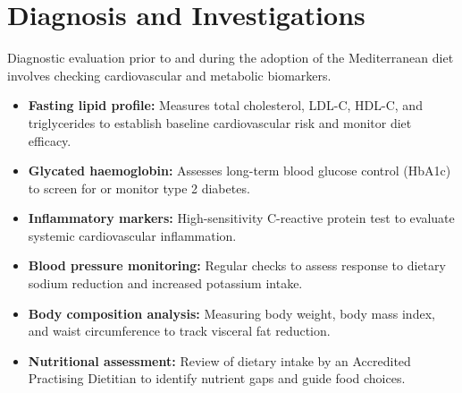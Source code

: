 \section*{Diagnosis and Investigations}
Diagnostic evaluation prior to and during the adoption of the Mediterranean diet involves checking cardiovascular and metabolic biomarkers.
\begin{itemize}
    \item \textbf{Fasting lipid profile:} Measures total cholesterol, LDL-C, HDL-C, and triglycerides to establish baseline cardiovascular risk and monitor diet efficacy.
    \item \textbf{Glycated haemoglobin:} Assesses long-term blood glucose control (HbA1c) to screen for or monitor type 2 diabetes.
    \item \textbf{Inflammatory markers:} High-sensitivity C-reactive protein test to evaluate systemic cardiovascular inflammation.
    \item \textbf{Blood pressure monitoring:} Regular checks to assess response to dietary sodium reduction and increased potassium intake.
    \item \textbf{Body composition analysis:} Measuring body weight, body mass index, and waist circumference to track visceral fat reduction.
    \item \textbf{Nutritional assessment:} Review of dietary intake by an Accredited Practising Dietitian to identify nutrient gaps and guide food choices.
\end{itemize}

